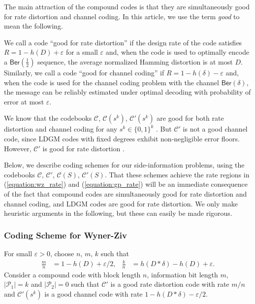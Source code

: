 The main attraction of the compound codes is that they are simultaneously good for rate distortion and channel coding.
In this article, we use the term \emph{good} to mean the following.
\begin{remark}
  We call a code ``good for rate distortion'' if the design rate of the code satisfies $R=1-h(D)+\varepsilon$ for a small $\varepsilon$ and, when the code is used to optimally encode a $\mathsf{Ber}(\tfrac{1}{2})$ sequence, the average normalized Hamming distortion is at most $D$.
  Similarly, we call a code ``good for channel coding'' if $R=1-h(\delta) - \varepsilon$ and, when the code is used for the channel coding problem with the channel $\mathsf{Ber}(\delta)$, the message can be reliably estimated under optimal decoding with probability of error at most $\varepsilon$.
\end{remark}

We know that the codebooks $\mathcal{C}$, $\mathcal{C}(s^k)$, $\mathcal{C}'(s^k)$ are good for both rate distortion and channel coding for any $s^k \in \{0,1\}^k$ \cite{Wainwright-it09}.
But $\mathcal{C}'$ is not a good channel code, since LDGM codes with fixed degrees exhibit non-negligible error floors.
However, $\mathcal{C}'$ is good for rate distortion \cite{Wainwright-it10}.

Below, we describe coding schemes for our side-information problems, using the codebooks $\mathcal{C}$, $\mathcal{C}'$, $\mathcal{C}(S)$, $\mathcal{C}'(S)$.
That these schemes achieve the rate regions in (\ref{equation:wz_rate}) and (\ref{equation:gp_rate}) will be an immediate consequence of the fact that compound codes are simultaneously good for rate distortion and channel coding, and LDGM codes are good for rate distortion.
We only make heuristic arguments in the following, but these can easily be made rigorous.

\subsubsection{Coding Scheme for Wyner-Ziv}
For small $\varepsilon>0$, choose $n$, $m$, $k$ such that
\begin{align*}
  \frac{m}{n} &= 1 - h(D) + \varepsilon/2, & \frac{k}{n}&=h(D*\delta) - h(D) + \varepsilon.
\end{align*}
Consider a compound code with block length $n$, information bit length $m$, $|\mathcal{P}_1|=k$ and $|\mathcal{P}_2|=0$ such that $\mathcal{C}'$ is a good rate distortion code with rate $m/n$ and $\mathcal{C}'(s^k)$ is a good channel code with rate $1-h(D*\delta) - \varepsilon/2$.


